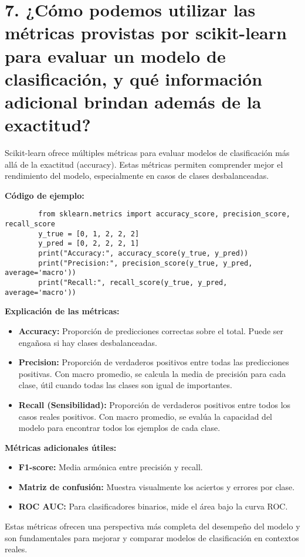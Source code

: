 \documentclass[a4paper,12pt]{article}
\begin{document}
	\section*{7. ¿Cómo podemos utilizar las métricas provistas por scikit-learn para evaluar un modelo de clasificación, y qué información adicional brindan además de la exactitud?}
	Scikit-learn ofrece múltiples métricas para evaluar modelos de clasificación más allá de la exactitud (accuracy). Estas métricas permiten comprender mejor el rendimiento del modelo, especialmente en casos de clases desbalanceadas.
	
	\textbf{Código de ejemplo:}
	\begin{verbatim}
		from sklearn.metrics import accuracy_score, precision_score, recall_score
		y_true = [0, 1, 2, 2, 2]
		y_pred = [0, 2, 2, 2, 1]
		print("Accuracy:", accuracy_score(y_true, y_pred))
		print("Precision:", precision_score(y_true, y_pred, average='macro'))
		print("Recall:", recall_score(y_true, y_pred, average='macro'))
	\end{verbatim}
	
	\textbf{Explicación de las métricas:}
	\begin{itemize}
		\item \textbf{Accuracy:} Proporción de predicciones correctas sobre el total. Puede ser engañosa si hay clases desbalanceadas.
		\item \textbf{Precision:} Proporción de verdaderos positivos entre todas las predicciones positivas. Con macro promedio, se calcula la media de precisión para cada clase, útil cuando todas las clases son igual de importantes.
		\item \textbf{Recall (Sensibilidad):} Proporción de verdaderos positivos entre todos los casos reales positivos. Con macro promedio, se evalúa la capacidad del modelo para encontrar todos los ejemplos de cada clase.
	\end{itemize}
	
	\textbf{Métricas adicionales útiles:}
	\begin{itemize}
		\item \textbf{F1-score:} Media armónica entre precisión y recall.
		\item \textbf{Matriz de confusión:} Muestra visualmente los aciertos y errores por clase.
		\item \textbf{ROC AUC:} Para clasificadores binarios, mide el área bajo la curva ROC.
	\end{itemize}
	
	Estas métricas ofrecen una perspectiva más completa del desempeño del modelo y son fundamentales para mejorar y comparar modelos de clasificación en contextos reales.
	
\end{document}
